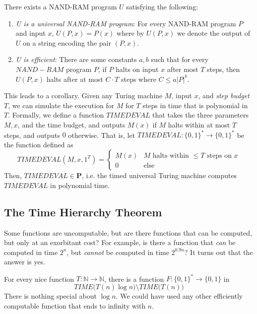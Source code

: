\documentclass{article}
\begin{document}
  \begin{theorem}
  There exists a NAND-RAM program $U$ satisfying the following: 
  \begin{enumerate}
      \item \textit{U is a universal NAND-RAM program}: For every NAND-RAM program $P$ and input $x$, $U(P, x) = P(x)$ where by $U(P, x)$ we denote the output of $U$ on a string encoding the pair $(P, x)$. 
      \item \textit{U is efficient}: There are some constants $a, b$ such that for every $NAND-RAM$ program $P$, if $P$ halts on input $x$ after most $T$ steps, then $U(P, x)$ halts after at most $C \cdot T$ steps where $C \leq a |P|^b$. 
  \end{enumerate}
  \end{theorem}

  This leads to a corollary. Given any Turing machine $M$, input $x$, and \textit{step budget} $T$, we can simulate the execution for $M$ for $T$ steps in time that is polynomial in $T$. Formally, we define a function $TIMEDEVAL$ that takes the three parameters $M, x$, and the time budget, and outputs $M(x)$ if $M$ halts within at most $T$ steps, and outputs $0$ otherwise. That is, let $TIMEDEVAL: \{0,1\}^* \longrightarrow \{0,1\}^*$ be the function defined as 
  \[TIMEDEVAL (M, x, 1^T) = \begin{cases}
  M(x) & M \text{ halts within } \leq T \text{ steps on } x \\
  0 & \text{else}
  \end{cases}\]
  Then, $TIMEDEVAL \in \mathbf{P}$, i.e. the timed universal Turing machine computes $TIMEDEVAL$ in polynomial time. 

  \subsection{The Time Hierarchy Theorem}
  Some functions are uncomputable, but are there functions that can be computed, but only at an exorbitant cost? For example, is there a function that \textit{can} be computed in time $2^n$, but \textit{cannot} be computed in time $2^{0.9 n}$? It turns out that the answer is yes. 

  \begin{theorem}
  For every nice function $T: \mathbb{N} \longrightarrow \mathbb{N}$, there is a function $F: \{0,1\}^* \longrightarrow \{0,1\}$ in 
  \[TIME \big( T(n) \log n\big) \setminus TIME \big( T(n)\big) \]
  There is nothing special about $\log n$. We could have used any other efficiently computable function that ends to infinity with $n$. 
  \end{theorem}
\end{document}
